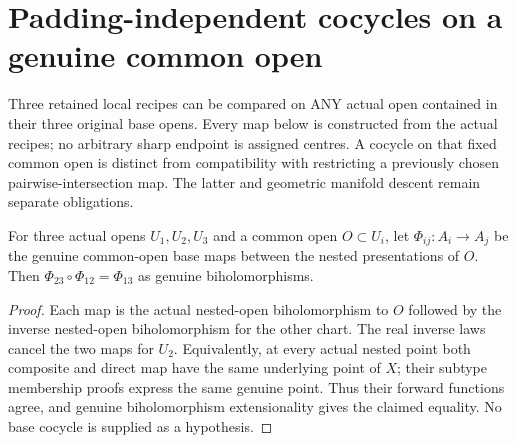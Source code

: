 \section{Padding-independent cocycles on a genuine common open}

Three retained local recipes can be compared on ANY actual open contained
in their three original base opens. Every map below is constructed from
the actual recipes; no arbitrary sharp endpoint is assigned centres.
A cocycle on that fixed common open is distinct from compatibility with
restricting a previously chosen pairwise-intersection map. The latter and
geometric manifold descent remain separate obligations.

\begin{lemma}
\label{hir:sharp-actual-curve-common-open-base-cocycle}
\leanok
For three actual opens $U_1,U_2,U_3$ and a common open $O\subset U_i$,
let $\Phi_{ij}:A_i\to A_j$ be the genuine common-open base maps between
the nested presentations of $O$. Then
$\Phi_{23}\circ\Phi_{12}=\Phi_{13}$ as genuine biholomorphisms.
\end{lemma}
\begin{proof}
Each map is the actual nested-open biholomorphism to $O$ followed by the
inverse nested-open biholomorphism for the other chart. The real inverse
laws cancel the two maps for $U_2$. Equivalently, at every actual nested
point both composite and direct map have the same underlying point of $X$;
their subtype membership proofs express the same genuine point. Thus their
forward functions agree, and genuine biholomorphism extensionality gives
the claimed equality. No base cocycle is supplied as a hypothesis.
\end{proof}


